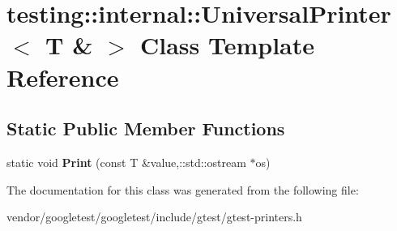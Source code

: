 \hypertarget{classtesting_1_1internal_1_1UniversalPrinter_3_01T_01_6_01_4}{}\section{testing\+:\+:internal\+:\+:Universal\+Printer$<$ T \& $>$ Class Template Reference}
\label{classtesting_1_1internal_1_1UniversalPrinter_3_01T_01_6_01_4}
\subsection*{Static Public Member Functions}
\begin{DoxyCompactItemize}
\item 
static void {\bfseries Print} (const T \&value,\+::std\+::ostream $\ast$os)\hypertarget{classtesting_1_1internal_1_1UniversalPrinter_3_01T_01_6_01_4_a2a63ddb20294c4234b7e8f3c7a56355d}{}\label{classtesting_1_1internal_1_1UniversalPrinter_3_01T_01_6_01_4_a2a63ddb20294c4234b7e8f3c7a56355d}

\end{DoxyCompactItemize}


The documentation for this class was generated from the following file\+:\begin{DoxyCompactItemize}
\item 
vendor/googletest/googletest/include/gtest/gtest-\/printers.\+h\end{DoxyCompactItemize}
